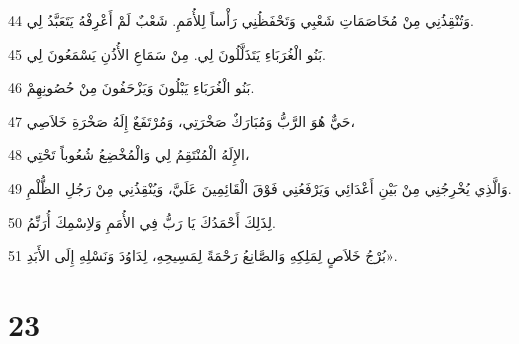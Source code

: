 \par 44 وَتُنْقِذُنِي مِنْ مُخَاصَمَاتِ شَعْبِي وَتَحْفَظُنِي رَأْساً لِلأُمَمِ. شَعْبٌ لَمْ أَعْرِفْهُ يَتَعَبَّدُ لِي.
\par 45 بَنُو الْغُرَبَاءِ يَتَذَلَّلُونَ لِي. مِنْ سَمَاعِ الأُذُنِ يَسْمَعُونَ لِي.
\par 46 بَنُو الْغُرَبَاءِ يَبْلُونَ وَيَزْحَفُونَ مِنْ حُصُونِهِمْ.
\par 47 حَيٌّ هُوَ الرَّبُّ وَمُبَارَكٌ صَخْرَتِي، وَمُرْتَفَعٌ إِلَهُ صَخْرَةِ خَلاَصِي،
\par 48 الإِلَهُ الْمُنْتَقِمُ لِي وَالْمُخْضِعُ شُعُوباً تَحْتِي،
\par 49 وَالَّذِي يُخْرِجُنِي مِنْ بَيْنِ أَعْدَائِي وَيَرْفَعُنِي فَوْقَ الْقَائِمِينَ عَلَيَّ، وَيُنْقِذُنِي مِنْ رَجُلِ الظُّلْمِ.
\par 50 لِذَلِكَ أَحْمَدُكَ يَا رَبُّ فِي الأُمَمِ وَلاِسْمِكَ أُرَنِّمُ.
\par 51 بُرْجُ خَلاَصٍ لِمَلِكِهِ وَالصَّانِعُ رَحْمَةً لِمَسِيحِهِ، لِدَاوُدَ وَنَسْلِهِ إِلَى الأَبَدِ».

\chapter{23}


